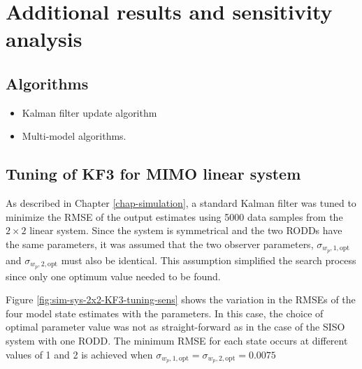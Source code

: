 \chapter{Additional results and sensitivity analysis}     %
\label{chap-Annex}                   %

\section{Algorithms} \label{section:annex-alg-KF}

\begin{itemize}
	\item Kalman filter update algorithm
	\item Multi-model algorithms.
\end{itemize}

\section{Tuning of KF3 for MIMO linear system} \label{section:annex-sim-2-KF-tuning}

As described in Chapter \ref{chap-simulation}, a standard Kalman filter was tuned to minimize the RMSE of the output estimates using 5000 data samples from the $2\times2$ linear system. Since the system is symmetrical and the two RODDs have the same parameters, it was assumed that the two observer parameters, $\sigma_{w_p,1,\text{opt}}$ and $\sigma_{w_p,2,\text{opt}}$ must also be identical. This assumption simplified the search process since only one optimum value needed to be found.

Figure \ref{fig:sim-sys-2x2-KF3-tuning-sens} shows the variation in the RMSEs of the four model state estimates with the parameters. In this case, the choice of optimal parameter value was not as straight-forward as in the case of the SISO system with one RODD. The minimum RMSE for each state occurs at different values of  1 and 2 is achieved when $\sigma_{w_p,1,\text{opt}}=\sigma_{w_p,2,\text{opt}}=0.0075$

